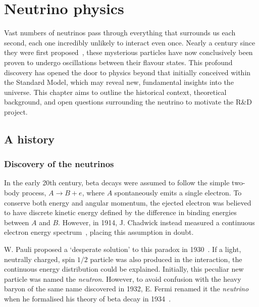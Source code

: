 \chapter{Neutrino physics} %
\label{chap:theory} %

Vast numbers of neutrinos pass through everything that surrounds us each second, each one
incredibly unlikely to interact even once. Nearly a century since they were first
proposed~\cite{pauli1930}, these mysterious particles have now conclusively been proven to undergo
oscillations between their flavour states. This profound discovery has opened the door to physics
beyond that initially conceived within the Standard Model, which may reveal new, fundamental
insights into the universe. This chapter aims to outline the historical context, theoretical
background, and open questions surrounding the neutrino to motivate the \chips R\&D project.

\section{A history} %
\label{sec:theory_history} %

\subsection{Discovery of the neutrinos} %
\label{sec:theory_history_neutrinos} %

In the early 20th century, beta decays were assumed to follow the simple two-body process,
$A\rightarrow B + e$, where $A$ spontaneously emits a single electron. To conserve both energy and
angular momentum, the ejected electron was believed to have discrete kinetic energy defined by the
difference in binding energies between $A$ and $B$. However, in 1914, J. Chadwick instead measured
a continuous electron energy spectrum~\cite{chadwick1914}, placing this assumption in doubt.

W. Pauli proposed a `desperate solution' to this paradox in 1930~\cite{pauli1930}. If a light,
neutrally charged, spin $1/2$ particle was also produced in the interaction, the continuous energy
distribution could be explained. Initially, this peculiar new particle was named the
\emph{neutron}. However, to avoid confusion with the heavy baryon of the same name discovered in
1932, E. Fermi renamed it the \emph{neutrino} when he formalised his theory of beta decay in
1934~\cite{fermi1934}.

